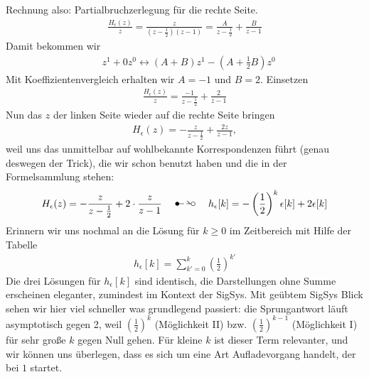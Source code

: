 \begin{ExCalc}
Rechnung also: Partialbruchzerlegung für die rechte Seite.
\begin{align}
\frac{H_\epsilon(z)}{z} = \frac{z}{(z-\frac{1}{2})(z-1)} = \frac{A}{z-\frac{1}{2}} + \frac{B}{z-1}
\end{align}
Damit bekommen wir
\begin{align}
&z^1  + 0 z^0 \leftrightarrow (A+B) z^1 - (A + \frac{1}{2}B) z^0
\end{align}
Mit Koeffizientenvergleich erhalten wir $A = -1$ und $B=2$.
Einsetzen
\begin{align}
\frac{H_\epsilon(z)}{z} = \frac{-1}{z-\frac{1}{2}} + \frac{2}{z-1}
\end{align}
Nun das $z$ der linken Seite wieder auf die rechte Seite bringen
\begin{align}
H_\epsilon(z) = -\frac{z}{z-\frac{1}{2}} + \frac{2 z}{z-1},
\end{align}
weil uns das unmittelbar auf wohlbekannte Korrespondenzen führt (genau deswegen der Trick),
die wir schon benutzt haben und die in der Formelsammlung stehen:
\begin{align}
H_\epsilon(z) = -\frac{z}{z-\frac{1}{2}} + 2\cdot\frac{z}{z-1}
\quad\Ztransf\quad
h_\epsilon[k] = - \left(\frac{1}{2}\right)^k \epsilon[k] + 2 \epsilon[k]
\end{align}
Erinnern wir uns nochmal an die Lösung für $k \geq 0$ im Zeitbereich mit Hilfe der Tabelle
\begin{align}
h_\epsilon[k] = \sum_{k'=0}^k \left(\frac{1}{2}\right)^{k'}
\end{align}
Die drei Lösungen für $h_\epsilon[k]$ sind identisch, die Darstellungen ohne Summe erscheinen
eleganter, zumindest im Kontext der SigSys. Mit geübtem SigSys Blick
sehen wir hier viel schneller was grundlegend passiert: die Sprungantwort
läuft asymptotisch gegen 2, weil $(\frac{1}{2})^{k}$ (Möglichkeit II) bzw.
$(\frac{1}{2})^{k-1}$ (Möglichkeit I) für sehr große $k$ gegen Null gehen.
Für kleine $k$ ist dieser Term relevanter, und wir können uns überlegen, dass
es sich um eine Art Aufladevorgang handelt, der bei $1$ startet.


\end{ExCalc}
